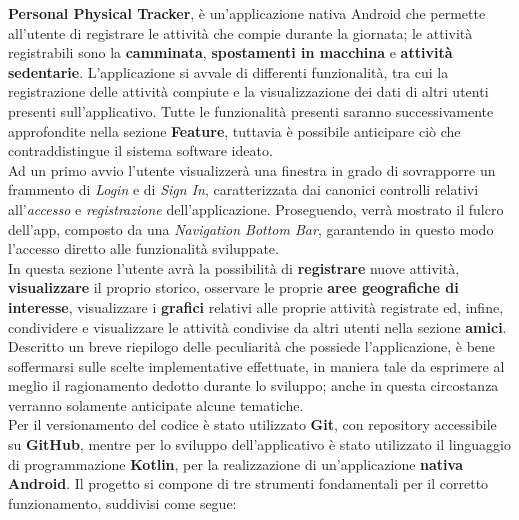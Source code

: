 \documentclass{article}
\begin{document}
\textbf{Personal Physical Tracker}, è un'applicazione nativa Android che permette all'utente di registrare le attività che compie durante la giornata; le attività registrabili sono la \textbf{camminata}, \textbf{spostamenti in macchina} e \textbf{attività sedentarie}.
L'applicazione si avvale di differenti funzionalità, tra cui la registrazione delle attività compiute e la visualizzazione dei dati di altri utenti presenti sull'applicativo. Tutte le funzionalità presenti saranno successivamente approfondite nella sezione \textbf{Feature}, tuttavia è possibile anticipare ciò che contraddistingue il sistema software ideato. \vspace*{7pt}\\
Ad un primo avvio l'utente visualizzerà una finestra in grado di sovrapporre un frammento di \textit{Login} e di \textit{Sign In}, caratterizzata dai canonici controlli relativi all'\textit{accesso} e \textit{registrazione} dell'applicazione. Proseguendo, verrà mostrato il fulcro dell'app, composto da una \textit{Navigation Bottom Bar}, garantendo in questo modo l'accesso diretto alle funzionalità sviluppate. \\
In questa sezione l'utente avrà la possibilità di \textbf{registrare} nuove attività, \textbf{visualizzare} il proprio storico, osservare le proprie \textbf{aree geografiche di interesse}, visualizzare i \textbf{grafici} relativi alle proprie attività registrate ed, infine, condividere e visualizzare le attività condivise da altri utenti nella sezione \textbf{amici}. \vspace*{7pt}\\
Descritto un breve riepilogo delle peculiarità che possiede l'applicazione, è bene soffermarsi sulle scelte implementative effettuate, in maniera tale da esprimere al meglio il ragionamento dedotto durante lo sviluppo; anche in questa circostanza verranno solamente anticipate alcune tematiche. \vspace*{7pt}\\
Per il versionamento del codice è stato utilizzato \textbf{Git}, con repository accessibile su \textbf{GitHub}, mentre per lo sviluppo dell'applicativo è stato utilizzato il linguaggio di programmazione \textbf{Kotlin}, per la realizzazione di un'applicazione \textbf{nativa Android}. Il progetto si compone di tre strumenti fondamentali per il corretto funzionamento, suddivisi come segue:
\end{document}

